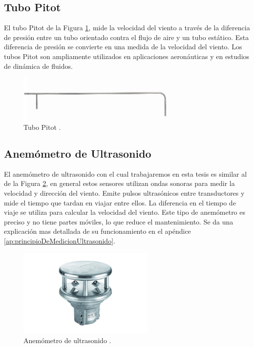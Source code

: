 \subsection*{Tubo Pitot}

El tubo Pitot  de la Figura \ref{fig:tuboPitot}, mide la velocidad del viento a través de la diferencia de presión entre un tubo orientado contra el flujo de aire y un tubo estático. Esta diferencia de presión se convierte en una medida de la velocidad del viento. Los tubos Pitot son ampliamente utilizados en aplicaciones aeronáuticas y en estudios de dinámica de fluidos.

\begin{figure}[h]
    \centering
    \includegraphics[width=0.7\textwidth]{Figuras/viento/sensores/tuboPitot.jpg}
    \caption{Tubo Pitot \cite{testoAnemometer}.}
    \label{fig:tuboPitot}
\end{figure}

\subsection*{Anemómetro de Ultrasonido}

El anemómetro de ultrasonido con el cual trabajaremos en esta tesis es similar al de la Figura \ref{fig:ultrasonido}, en general estos sensores utilizan ondas sonoras para medir la velocidad y dirección del viento. Emite pulsos ultrasónicos entre transductores y mide el tiempo que tardan en viajar entre ellos. La diferencia en el tiempo de viaje se utiliza para calcular la velocidad del viento. Este tipo de anemómetro es preciso y no tiene partes móviles, lo que reduce el mantenimiento. Se da una explicación mas detallada de su funcionamiento en el apéndice \ref{ap:principioDeMedicionUltrasonido}.

\begin{figure}[h]
    \centering
    \includegraphics[width=0.6\textwidth]{Figuras/viento/sensores/ultrasonido.png}
    \caption{Anemómetro de ultrasonido \cite{ventusumb2024}.}
    \label{fig:ultrasonido}
\end{figure}


